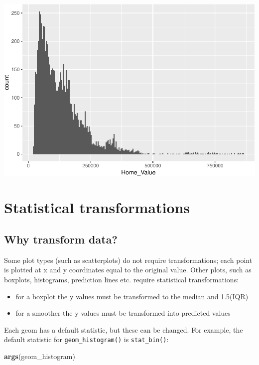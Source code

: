 \documentclass[
]{book}
\newenvironment{Shaded}{\begin{snugshade}}{\end{snugshade}}
\newcommand{\KeywordTok}[1]{\textcolor[rgb]{0.13,0.29,0.53}{\textbf{#1}}}
\newcommand{\NormalTok}[1]{#1}
\providecommand{\tightlist}{%
  \setlength{\itemsep}{0pt}\setlength{\parskip}{0pt}}
\begin{document}
\begin{alert}
\includegraphics{R/Rgraphics/figures/unnamed-chunk-164-1.pdf}

\end{alert}

\hypertarget{statistical-transformations}{%
\section{Statistical transformations}\label{statistical-transformations}}

\hypertarget{why-transform-data}{%
\subsection{Why transform data?}\label{why-transform-data}}

Some plot types (such as scatterplots) do not require transformations; each point is plotted at x and y coordinates equal to the original value. Other plots, such as boxplots, histograms, prediction lines etc. require statistical transformations:

\begin{itemize}
\tightlist
\item
  for a boxplot the y values must be transformed to the median and 1.5(IQR)
\item
  for a smoother the y values must be transformed into predicted values
\end{itemize}

Each geom has a default statistic, but these can be changed. For example, the default statistic for \texttt{geom\_histogram()} is \texttt{stat\_bin()}:

\begin{Shaded}
\begin{Highlighting}[]
\KeywordTok{args}\NormalTok{(geom\_histogram)}
\end{Highlighting}
\end{Shaded}
\end{document}
